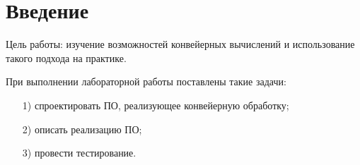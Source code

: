 \chapter*{Введение}
\label{cha:intro}
Цель работы: изучение возможностей конвейерных вычислений и использование такого подхода на практике.

При выполнении лабораторной работы поставлены такие задачи:
\begin{enumerate}[1)]
	\item[1)] спроектировать ПО, реализующее конвейерную обработку;
	\item[2)] описать реализацию ПО;
	\item[3)] провести тестирование.
\end{enumerate}